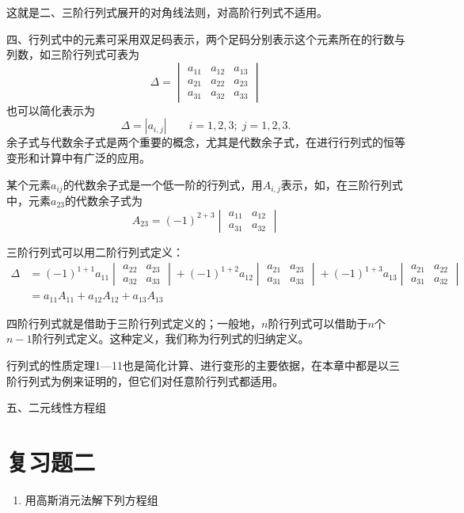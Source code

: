 这就是二、三阶行列式展开的对角线法则，对高阶行列式不适用。

四、行列式中的元素可采用双足码表示，两个足码分别表示这个元素所在的行数与列数，如三阶行列式可表为
\[\Delta =\begin{vmatrix}
    a_{11}&a_{12}&a_{13}\\a_{21}&a_{22}&a_{23}\\a_{31}&a_{32}&a_{33}
\end{vmatrix}\]
也可以简化表示为
\[\Delta =|a_{i,j}|\qquad i=1,2,3;\; j=1,2,3.\]
余子式与代数余子式是两个重要的概念，尤其是代数余子式，在进行行列式的恒等变形和计算中有广泛的应用。

某个元素$a_{ij}$的代数余子式是一个低一阶的行列式，用$A_{i,j}$表示，如，在三阶行列式中，元素$a_{23}$的代数余子式为
\[A_{23}=(-1)^{2+3}\begin{vmatrix}
    a_{11}&a_{12}\\a_{31}&a_{32}
\end{vmatrix}\]

三阶行列式可以用二阶行列式定义：
\[\begin{split}
\Delta&=(-1)^{1+1}a_{11}\begin{vmatrix}
    a_{22}&a_{23}\\a_{32}&a_{33}
\end{vmatrix}+(-1)^{1+2}a_{12}\begin{vmatrix}
    a_{21}&a_{23}\\a_{31}&a_{33}
\end{vmatrix}+(-1)^{1+3}a_{13}\begin{vmatrix}
    a_{21}&a_{22}\\a_{31}&a_{32}
\end{vmatrix}\\
&=a_{11}A_{11}+a_{12}A_{12}+a_{13}A_{13}
\end{split}\]

四阶行列式就是借助于三阶行列式定义的；一般地，$n$阶行列式可以借助于$n$个$n-1$阶行列式定义。这种定义，我们称为行列式的归纳定义。

行列式的性质定理1—11也是简化计算、进行变形的主要依据，在本章中都是以三阶行列式为例来证明的，但它们对任意阶行列式都适用。

五、二元线性方程组
     













\section*{复习题二}
\begin{enumerate}
    \item 用高斯消元法解下列方程组











\end{enumerate}